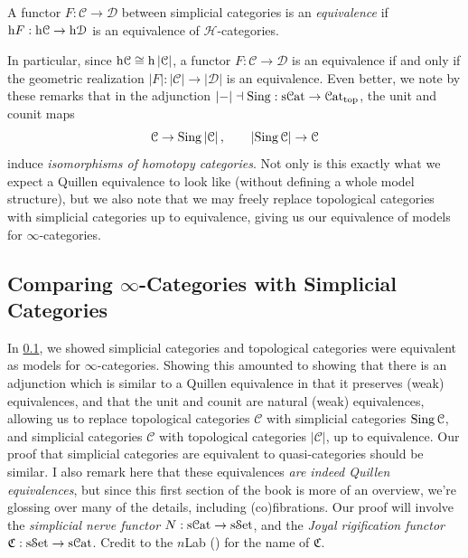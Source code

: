 \begin{definition}\label{1.1.4.3}
	A functor $F : \mathcal{C}  \to \mathcal{D} $ between simplicial categories is an \emph{equivalence} if $\mathrm{h} F : \mathrm{h}\mathcal{C}  \to \mathrm{h}\mathcal{D} $ is an equivalence of $\mathcal{H} $-categories.
\end{definition}

In particular, since $\mathrm{h} \mathcal{C} \cong \mathrm{h}\left| \mathcal{C}  \right| $, a functor $F : \mathcal{C}  \to \mathcal{D} $ is an equivalence if and only if the geometric realization $\left| F \right| : \left| \mathcal{C}  \right|  \to \left| \mathcal{D}  \right| $ is an equivalence. Even better, we note by these remarks that in the adjunction $\left| - \right| \dashv\operatorname{Sing} : \mathrm{s} \mathcal{C}\mathrm{at}  \to \mathcal{C}\mathrm{at} _{\text{top} } $, the unit and counit maps
\[
	\mathcal{C} \to \operatorname{Sing} \left| \mathcal{C}  \right| ,\qquad \left| \operatorname{Sing} \mathcal{C}  \right| \to \mathcal{C} 
\]
induce \emph{isomorphisms of homotopy categories}. Not only is this exactly what we expect a Quillen equivalence to look like (without defining a whole model structure), but we also note that we may freely replace topological categories with simplicial categories up to equivalence, giving us our equivalence of models for $\infty $-categories.

\subsection{Comparing $\infty $-Categories with Simplicial Categories}\label{sec1.1.4}

In \cref{sec1.1.4}, we showed simplicial categories and topological categories were equivalent as models for $\infty $-categories. Showing this amounted to showing that there is an adjunction which is similar to a Quillen equivalence in that it preserves (weak) equivalences, and that the unit and counit are natural (weak) equivalences, allowing us to replace topological categories $\mathcal{C} $ with simplicial categories $\operatorname{Sing} \mathcal{C} $, and simplicial categories $\mathcal{C} $ with topological categories $\left| \mathcal{C}  \right| $, up to equivalence. Our proof that simplicial categories are equivalent to quasi-categories should be similar. I also remark here that these equivalences \emph{are indeed Quillen equivalences}, but since this first section of the book is more of an overview, we're glossing over many of the details, including (co)fibrations. Our proof will involve the \emph{simplicial nerve functor} $N : \mathrm{s} \mathcal{C}\mathrm{at}  \to \mathrm{s}\mathcal{S}\mathrm{et} $, and the \emph{Joyal rigification functor} $\mathfrak{C} : \mathrm{s}\mathcal{S}\mathrm{et}  \to \mathrm{s} \mathcal{C}\mathrm{at} $. Credit to the $n$Lab (\cite{nlab}) for the name of $\mathfrak{C} $.

